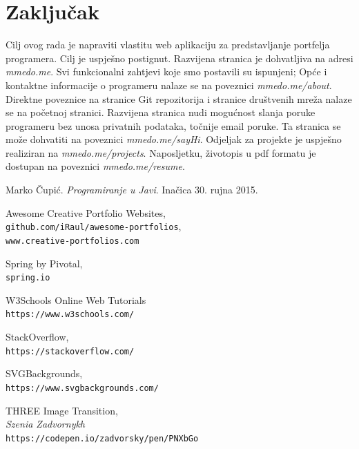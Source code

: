 \documentclass[times, utf8, zavrsni, numeric]{fer}
\begin{document}
\chapter{Zaključak}
\qquad Cilj ovog rada je napraviti vlastitu web aplikaciju za predstavljanje portfelja programera.
Cilj je uspješno postignut.
Razvijena stranica je dohvatljiva na adresi \textit{mmedo.me}.
Svi funkcionalni zahtjevi koje smo postavili su ispunjeni;
Opće i kontaktne informacije o programeru nalaze se na poveznici \textit{mmedo.me/about}.
Direktne poveznice na stranice Git repozitorija i stranice društvenih mreža nalaze se na početnoj stranici.
Razvijena stranica nudi mogućnost slanja poruke programeru bez unosa privatnih podataka, točnije email poruke.
Ta stranica se može dohvatiti na poveznici \textit{mmedo.me/sayHi}.
Odjeljak za projekte je uspješno realiziran na \textit{mmedo.me/projects}.
Naposljetku, životopis u pdf formatu je dostupan na poveznici \textit{mmedo.me/resume}.



\begin{thebibliography}{9}
				Marko Čupić.
				\textit{Programiranje u Javi}.
				Inačica 30. rujna 2015.

				Awesome Creative Portfolio Websites,
				\\\texttt{github.com/iRaul/awesome-portfolios},
				\\\texttt{www.creative-portfolios.com}

				Spring by Pivotal,
				\\\texttt{spring.io}

				W3Schools Online Web Tutorials
				\\\texttt{https://www.w3schools.com/}

				StackOverflow,
				\\\texttt{https://stackoverflow.com/}

				SVGBackgrounds,
				\\\texttt{https://www.svgbackgrounds.com/}

				THREE Image Transition,\\
				\textit{Szenia Zadvornykh} \\
				\texttt{https://codepen.io/zadvorsky/pen/PNXbGo}
\end{thebibliography}
\end{document}
